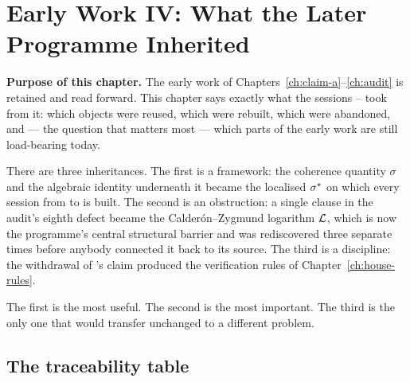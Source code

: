 \chapter{Early Work IV: What the Later Programme Inherited}
\label{ch:inheritance}

\begin{record}
\textbf{Purpose of this chapter.} The early work of
Chapters~\ref{ch:claim-a}--\ref{ch:audit} is retained and read forward. This
chapter says exactly what the sessions -- took from it: which
objects were reused, which were rebuilt, which were abandoned, and --- the
question that matters most --- which parts of the early work are still
load-bearing today.
\end{record}

There are three inheritances. The first is a framework: the coherence
quantity \(\sigma\) and the algebraic identity underneath it became the
localised \(\sigma^{*}\) on which every session from  to  is built.
The second is an obstruction: a single clause in the audit's eighth defect
became the Calder\'on--Zygmund logarithm \(\mathcal{L}\), which is now the
programme's central structural barrier and was rediscovered three separate
times before anybody connected it back to its source. The third is a
discipline: the withdrawal of 's claim produced the verification rules
of Chapter~\ref{ch:house-rules}.

The first is the most useful. The second is the most important. The third is
the only one that would transfer unchanged to a different problem.

\section{The traceability table}
\label{sec:traceability}

